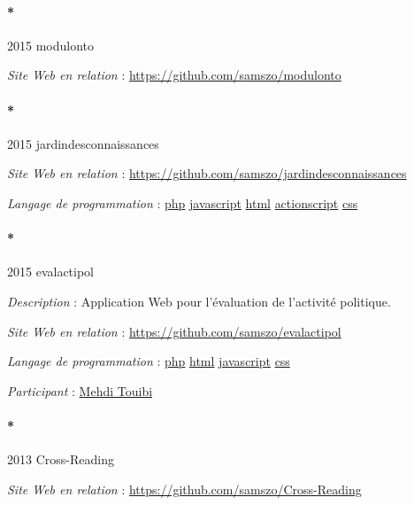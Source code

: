 \documentclass[
  a4paper,
  DIV=11,
  numbers=noendperiod]{scrreprt}
\let\oldparagraph\paragraph
\renewcommand{\paragraph}[1]{\oldparagraph{#1}\mbox{}}
\begin{document}
\paragraph*{2015 modulonto}\label{sec-item301783}

\emph{Site Web en relation} : \url{https://github.com/samszo/modulonto}

\paragraph*{2015 jardindesconnaissances}\label{sec-item301784}

\emph{Site Web en relation} :
\url{https://github.com/samszo/jardindesconnaissances}

\emph{Langage de programmation} :
\href{http://localhost/samszo/omk/s/fiches/item/108369}{php}
\href{http://localhost/samszo/omk/s/fiches/item/89711}{javascript}
\href{http://localhost/samszo/omk/s/fiches/item/96621}{html}
\href{http://localhost/samszo/omk/s/fiches/item/158736}{actionscript}
\href{http://localhost/samszo/omk/s/fiches/item/102418}{css}

\paragraph*{2015 evalactipol}\label{sec-item299750}

\emph{Description} : Application Web pour l'évaluation de l'activité
politique.

\emph{Site Web en relation} :
\url{https://github.com/samszo/evalactipol}

\emph{Langage de programmation} :
\href{http://localhost/samszo/omk/s/fiches/item/108369}{php}
\href{http://localhost/samszo/omk/s/fiches/item/96621}{html}
\href{http://localhost/samszo/omk/s/fiches/item/89711}{javascript}
\href{http://localhost/samszo/omk/s/fiches/item/102418}{css}

\emph{Participant} :
\href{http://localhost/samszo/omk/s/fiches/item/299781}{Mehdi Touibi}

\paragraph*{2013 Cross-Reading}\label{sec-item301770}

\emph{Site Web en relation} :
\url{https://github.com/samszo/Cross-Reading}
\end{document}
